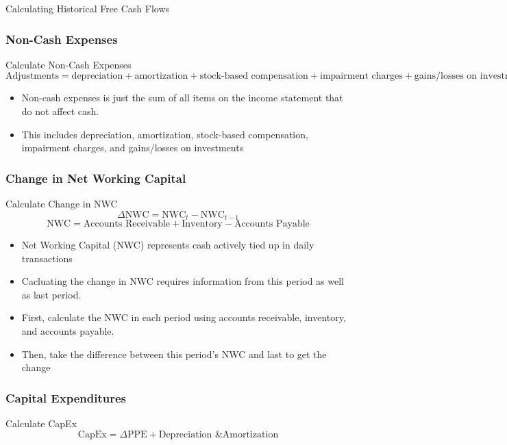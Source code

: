 \documentclass[handout, 11pt]{beamer}
\begin{document}
\begin{section}{Calculating Historical Free Cash Flows}
\begin{frame}
\frametitle{Non-Cash Expenses}
\begin{block}{Calculate Non-Cash Expenses}
$\text{Adjustments} = \text{depreciation} + \text{amortization} + \text{stock-based compensation} + \text{impairment charges} + \text{gains/losses on investments}$
\end{block}
\vfill
\begin{itemize}
\item Non-cash expenses is just the sum of all items on the income statement that do not affect cash.
\vfill
\item This includes depreciation, amortization, stock-based compensation, impairment charges, and gains/losses on investments
\end{itemize}
\end{frame}
\begin{frame}
\frametitle{Change in Net Working Capital}
\begin{block}{Calculate Change in NWC}
\begin{equation}
	\Delta\text{NWC} = \text{NWC}_t - \text{NWC}_{t-1}
\end{equation}
\begin{equation}
	\text{NWC} = \text{Accounts Receivable} + \text{Inventory} - \text{Accounts Payable}
\end{equation}
\end{block}
\vfill
\begin{itemize}
\item Net Working Capital (NWC) represents cash actively tied up in daily transactions
\vfill
\item Cacluating the change in NWC requires information from this period as well as last period.
\vfill
\item First, calculate the NWC in each period using accounts receivable, inventory, and accounts payable.
\vfill
\item Then, take the difference between this period's NWC and last to get the change
\end{itemize}
\end{frame}
\begin{frame}
\frametitle{Capital Expenditures}
\begin{block}{Calculate CapEx}
\begin{equation}
	\text{CapEx} = \Delta\text{PPE} + \text{Depreciation \& Amortization}
\end{equation}

\end{block}
\end{frame}
\end{section}
\end{document}
